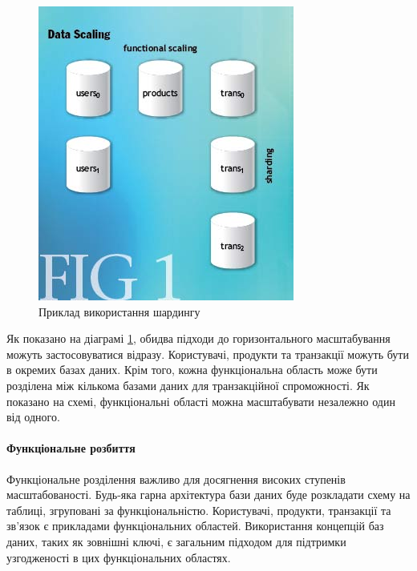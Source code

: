 \documentclass[14pt]{vakthesis}
\begin{document}
\begin{figure}
\centering
\includegraphics[width=\linewidth]{images/data_scale_base.jpg}
     \caption{Приклад використання шардингу}
     \label{fig:sharding}
\end{figure}

Як показано на діаграмі \ref{fig:sharding}, обидва підходи до горизонтального масштабування можуть застосовуватися відразу. Користувачі, продукти та транзакції можуть бути в окремих базах даних. Крім того, кожна функціональна область може бути розділена між кількома базами даних для транзакційної спроможності. Як показано на схемі, функціональні області можна масштабувати незалежно один від одного.

\paragraph{Функціональне розбиття}

Функціональне розділення важливо для досягнення високих ступенів масштабованості. Будь-яка гарна архітектура бази даних буде розкладати схему на таблиці, згруповані за функціональністю. Користувачі, продукти, транзакції та зв'язок є прикладами функціональних областей. Використання концепцій баз даних, таких як зовнішні ключі, є загальним підходом для підтримки узгодженості в цих функціональних областях.
\end{document}
